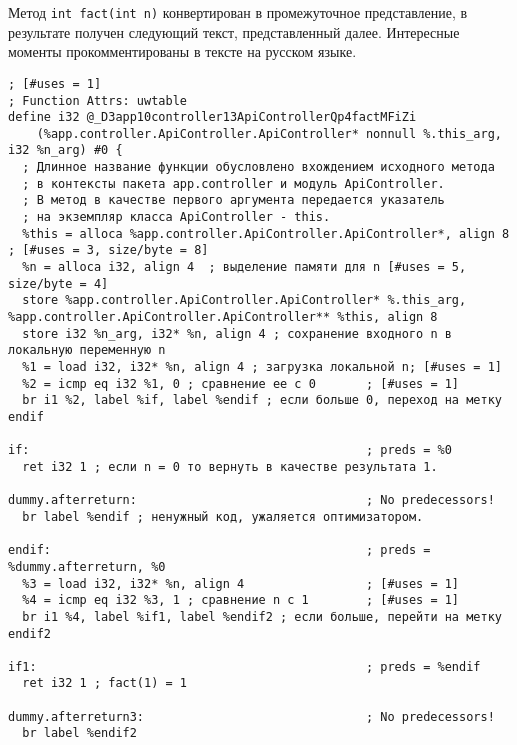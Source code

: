 \documentclass[732]{studrep}
\begin{document}
Метод \verb-int fact(int n)- конвертирован в промежуточное представление, в результате получен следующий текст, представленный далее.  Интересные моменты прокомментированы в тексте на русском языке.

\begin{verbatim}
; [#uses = 1]
; Function Attrs: uwtable
define i32 @_D3app10controller13ApiControllerQp4factMFiZi
    (%app.controller.ApiController.ApiController* nonnull %.this_arg, i32 %n_arg) #0 {
  ; Длинное название функции обусловлено вхождением исходного метода
  ; в контексты пакета app.controller и модуль ApiController.
  ; В метод в качестве первого аргумента передается указатель
  ; на экземпляр класса ApiController - this.
  %this = alloca %app.controller.ApiController.ApiController*, align 8 ; [#uses = 3, size/byte = 8]
  %n = alloca i32, align 4  ; выделение памяти для n [#uses = 5, size/byte = 4]
  store %app.controller.ApiController.ApiController* %.this_arg, %app.controller.ApiController.ApiController** %this, align 8
  store i32 %n_arg, i32* %n, align 4 ; сохранение входного n в локальную переменную n
  %1 = load i32, i32* %n, align 4 ; загрузка локальной n; [#uses = 1]
  %2 = icmp eq i32 %1, 0 ; сравнение ее с 0       ; [#uses = 1]
  br i1 %2, label %if, label %endif ; если больше 0, переход на метку endif

if:                                               ; preds = %0
  ret i32 1 ; если n = 0 то вернуть в качестве результата 1.

dummy.afterreturn:                                ; No predecessors!
  br label %endif ; ненужный код, ужаляется оптимизатором.

endif:                                            ; preds = %dummy.afterreturn, %0
  %3 = load i32, i32* %n, align 4                 ; [#uses = 1]
  %4 = icmp eq i32 %3, 1 ; сравнение n с 1        ; [#uses = 1]
  br i1 %4, label %if1, label %endif2 ; если больше, перейти на метку endif2

if1:                                              ; preds = %endif
  ret i32 1 ; fact(1) = 1

dummy.afterreturn3:                               ; No predecessors!
  br label %endif2


\end{verbatim}
\end{document}
